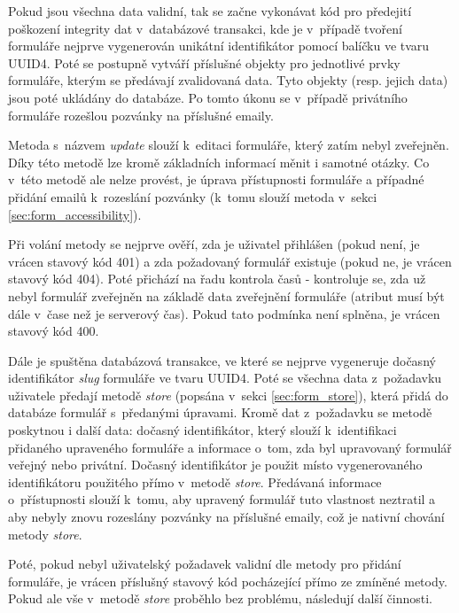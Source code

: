 			Pokud jsou všechna data validní, tak se začne vykonávat kód pro předejití poškození integrity dat v~databázové transakci, kde je v~případě tvoření formuláře nejprve vygenerován unikátní identifikátor pomocí balíčku  ve tvaru UUID4. Poté se postupně vytváří příslušné objekty pro jednotlivé prvky formuláře, kterým se předávají zvalidovaná data. Tyto objekty (resp. jejich data) jsou poté ukládány do databáze. Po tomto úkonu se v~případě privátního formuláře rozešlou pozvánky na příslušné emaily.
			
			\label{sec:form_update}
			Metoda s~názvem \textit{update} slouží k~editaci formuláře, který zatím nebyl zveřejněn. Díky této metodě lze kromě základních informací měnit i samotné otázky. Co v~této metodě ale nelze provést, je úprava přístupnosti formuláře a případné přidání emailů k~rozeslání pozvánky (k~tomu slouží metoda v~sekci \ref{sec:form_accessibility}).
			
			Při volání metody se nejprve ověří, zda je uživatel přihlášen (pokud není, je vrácen stavový kód 401) a zda požadovaný formulář existuje (pokud ne, je vrácen stavový kód 404). Poté přichází na řadu kontrola časů - kontroluje se, zda už nebyl formulář zveřejněn na základě data zveřejnění formuláře (atribut musí být dále v~čase než je serverový čas). Pokud tato podmínka není splněna, je vrácen stavový kód 400.
			
			Dále je spuštěna databázová transakce, ve které se nejprve vygeneruje dočasný identifikátor \textit{slug} formuláře ve tvaru UUID4. Poté se všechna data z~požadavku uživatele předají metodě \textit{store} (popsána v~sekci \ref{sec:form_store}), která přidá do databáze formulář s~předanými úpravami. Kromě dat z~požadavku se metodě poskytnou i další data: dočasný identifikátor, který slouží k~identifikaci přidaného upraveného formuláře a informace o~tom, zda byl upravovaný formulář veřejný nebo privátní. Dočasný identifikátor je použit místo vygenerovaného identifikátoru použitého přímo v~metodě \textit{store}. Předávaná informace o~přístupnosti slouží k~tomu, aby upravený formulář tuto vlastnost neztratil a aby nebyly znovu rozeslány pozvánky na příslušné emaily, což je nativní chování metody \textit{store}. 
			
			Poté, pokud nebyl uživatelský požadavek validní dle metody pro přidání formuláře, je vrácen příslušný stavový kód pocházející přímo ze zmíněné metody. Pokud ale vše v~metodě \textit{store} proběhlo bez problému, následují další činnosti. 
			
